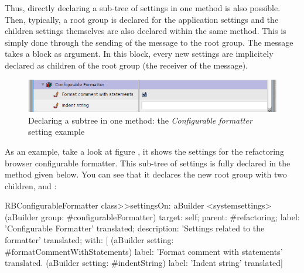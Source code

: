 \documentclass[a4paper,10pt,twoside]{book}
\begin{document}
Thus, directly declaring a sub-tree of settings in one method is also possible. Then, typically, a root group is declared for the application settings and the children settings themselves are also declared within the same method. This is simply done through the sending of the  message to the root group. The  message takes a block as argument. In this block, every new settings are implicitely declared as children of the root group (the receiver of the  message). 

\begin{figure}[tbh]
\begin{center}
\includegraphics[scale=0.47]{configurableFormatter}
\caption{Declaring a subtree in one method: the \textit{Configurable formatter} setting example}
\end{center}
\end{figure}
As an example, take a look at figure , it shows the settings for the refactoring browser configurable formatter. This sub-tree of settings is fully declared in the method  given below. You can see that it declares the new root group  with two children,  and :
\begin{code}{}
RBConfigurableFormatter class>>settingsOn: aBuilder
	<systemsettings>	
	(aBuilder group: #configurableFormatter)
		target: self;
		parent: #refactoring;
		label: 'Configurable Formatter' translated;
		description: 'Settings related to the formatter' translated;
		with: [
			(aBuilder setting: #formatCommentWithStatements)
				label: 'Format comment with statements' translated.
			(aBuilder setting: #indentString)
				label: 'Indent string' translated]
\end{code}
\end{document}
